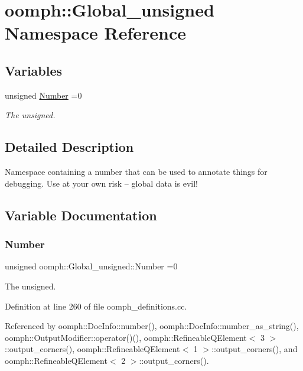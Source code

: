 \hypertarget{namespaceoomph_1_1Global__unsigned}{}\section{oomph\+:\+:Global\+\_\+unsigned Namespace Reference}
\label{namespaceoomph_1_1Global__unsigned}
\subsection*{Variables}
\begin{DoxyCompactItemize}
\item 
unsigned \hyperlink{namespaceoomph_1_1Global__unsigned_aa0b4579f7ee228aaf16302f4b39e0fdf}{Number} =0
\begin{DoxyCompactList}\small\item\em The unsigned. \end{DoxyCompactList}\end{DoxyCompactItemize}


\subsection{Detailed Description}
Namespace containing a number that can be used to annotate things for debugging. Use at your own risk -- global data is evil! 

\subsection{Variable Documentation}
\mbox{\label{namespaceoomph_1_1Global__unsigned_aa0b4579f7ee228aaf16302f4b39e0fdf}} 
\subsubsection{\texorpdfstring{Number}{Number}}
{\footnotesize\ttfamily unsigned oomph\+::\+Global\+\_\+unsigned\+::\+Number =0}



The unsigned. 



Definition at line 260 of file oomph\+\_\+definitions.\+cc.



Referenced by oomph\+::\+Doc\+Info\+::number(), oomph\+::\+Doc\+Info\+::number\+\_\+as\+\_\+string(), oomph\+::\+Output\+Modifier\+::operator()(), oomph\+::\+Refineable\+Q\+Element$<$ 3 $>$\+::output\+\_\+corners(), oomph\+::\+Refineable\+Q\+Element$<$ 1 $>$\+::output\+\_\+corners(), and oomph\+::\+Refineable\+Q\+Element$<$ 2 $>$\+::output\+\_\+corners().

